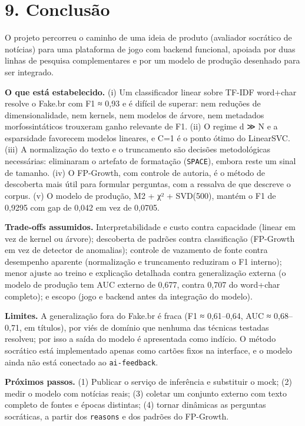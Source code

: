\documentclass[
  brazilian,
  11pt,
]{article}
\begin{document}
\section{9. Conclusão}\label{conclusuxe3o-1}

O projeto percorreu o caminho de uma ideia de produto (avaliador socrático de notícias) para uma plataforma de jogo com backend funcional, apoiada por duas linhas de pesquisa complementares e por um modelo de produção desenhado para ser integrado.

\textbf{O que está estabelecido.} (i) Um classificador linear sobre TF-IDF word+char resolve o Fake.br com F1 ≈ 0,93 e é difícil de superar: nem reduções de dimensionalidade, nem kernels, nem modelos de árvore, nem metadados morfossintáticos trouxeram ganho relevante de F1. (ii) O regime d ≫ N e a esparsidade favorecem modelos lineares, e C=1 é o ponto ótimo do LinearSVC. (iii) A normalização do texto e o truncamento são decisões metodológicas necessárias: eliminaram o artefato de formatação (\texttt{SPACE}), embora reste um sinal de tamanho. (iv) O FP-Growth, com controle de autoria, é o método de descoberta mais útil para formular perguntas, com a ressalva de que descreve o corpus. (v) O modelo de produção, M2 + χ² + SVD(500), mantém o F1 de 0,9295 com gap de 0,042 em vez de 0,0705.

\textbf{Trade-offs assumidos.} Interpretabilidade e custo contra capacidade (linear em vez de kernel ou árvore); descoberta de padrões contra classificação (FP-Growth em vez de detector de anomalias); controle de vazamento de fonte contra desempenho aparente (normalização e truncamento reduziram o F1 interno); menor ajuste ao treino e explicação detalhada contra generalização externa (o modelo de produção tem AUC externo de 0,677, contra 0,707 do word+char completo); e escopo (jogo e backend antes da integração do modelo).

\textbf{Limites.} A generalização fora do Fake.br é fraca (F1 ≈ 0,61--0,64, AUC ≈ 0,68--0,71, em títulos), por viés de domínio que nenhuma das técnicas testadas resolveu; por isso a saída do modelo é apresentada como indício. O método socrático está implementado apenas como cartões fixos na interface, e o modelo ainda não está conectado ao \texttt{ai-feedback}.

\textbf{Próximos passos.} (1) Publicar o serviço de inferência e substituir o mock; (2) medir o modelo com notícias reais; (3) coletar um conjunto externo com texto completo de fontes e épocas distintas; (4) tornar dinâmicas as perguntas socráticas, a partir dos \texttt{reasons} e dos padrões do FP-Growth.
\end{document}
